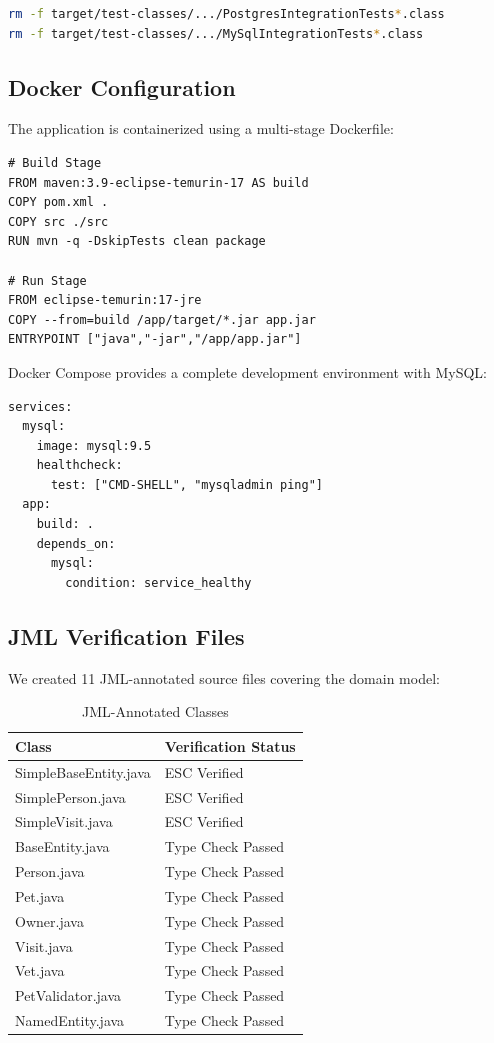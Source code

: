 \documentclass[sigconf]{acmart}
\begin{document}
\begin{lstlisting}[language=bash, caption={Integration Test Exclusion}]
rm -f target/test-classes/.../PostgresIntegrationTests*.class
rm -f target/test-classes/.../MySqlIntegrationTests*.class
\end{lstlisting}

\subsection{Docker Configuration}

The application is containerized using a multi-stage Dockerfile:

\begin{lstlisting}[caption={Multi-stage Dockerfile}]
# Build Stage
FROM maven:3.9-eclipse-temurin-17 AS build
COPY pom.xml .
COPY src ./src
RUN mvn -q -DskipTests clean package

# Run Stage
FROM eclipse-temurin:17-jre
COPY --from=build /app/target/*.jar app.jar
ENTRYPOINT ["java","-jar","/app/app.jar"]
\end{lstlisting}

Docker Compose provides a complete development environment with MySQL:

\begin{lstlisting}[style=yamlstyle, caption={Docker Compose Configuration}]
services:
  mysql:
    image: mysql:9.5
    healthcheck:
      test: ["CMD-SHELL", "mysqladmin ping"]
  app:
    build: .
    depends_on:
      mysql:
        condition: service_healthy
\end{lstlisting}

\subsection{JML Verification Files}

We created 11 JML-annotated source files covering the domain model:

\begin{table}[h]
\caption{JML-Annotated Classes}
\begin{tabular}{ll}
\toprule
\textbf{Class} & \textbf{Verification Status} \\
\midrule
SimpleBaseEntity.java & ESC Verified \\
SimplePerson.java & ESC Verified \\
SimpleVisit.java & ESC Verified \\
BaseEntity.java & Type Check Passed \\
Person.java & Type Check Passed \\
Pet.java & Type Check Passed \\
Owner.java & Type Check Passed \\
Visit.java & Type Check Passed \\
Vet.java & Type Check Passed \\
PetValidator.java & Type Check Passed \\
NamedEntity.java & Type Check Passed \\
\bottomrule
\end{tabular}
\end{table}
\end{document}
